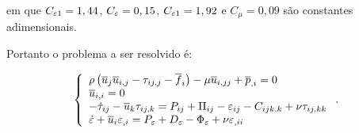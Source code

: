 \documentclass[_ArquivoPrincipal.tex]{subfiles}
\begin{document}
\noindent em que $C_{\varepsilon 1}=1,44$, $C_\varepsilon=0,15$, $C_{\varepsilon 1}=1,92$ e $C_\mu=0,09$ são constantes adimensionais.

Portanto o problema a ser resolvido é:

\begin{equation}
    \left\{
    \begin{array}{l}
        \rho\left({\overline{u}_j\overline{u}_{i,j}-\tau_{ij,j}-\overline{f}_i}\right)-\mu\overline{u}_{i,jj}+\overline{p}_{,i}=0 \\
        \overline{u}_{i,i}=0                                                                                      \\
        -\dot{\tau}_{ij}-\overline{u}_k\tau_{ij,k}=P_{ij}+\Pi_{ij}-\varepsilon_{ij}-C_{ijk,k}+\nu\tau_{ij,kk}     \\
        \dot{\varepsilon}+\overline{u}_i\varepsilon_{,i}=P_\varepsilon+D_\varepsilon-\Phi_\varepsilon+\nu\varepsilon_{,ii}
    \end{array}
    \right.\text{.}
\end{equation}
\end{document}
